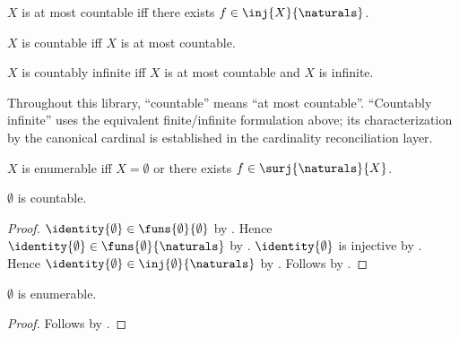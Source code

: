 \begin{definition}\label{at_most_countable}
    $X$ is at most countable iff there exists $f\in\inj{X}{\naturals}$.
\end{definition}

\begin{abbreviation}\label{countable}
    $X$ is countable iff $X$ is at most countable.
\end{abbreviation}

\begin{definition}\label{countably_infinite}
    $X$ is countably infinite iff $X$ is at most countable and $X$ is infinite.
\end{definition}

Throughout this library, ``countable'' means ``at most countable''.
``Countably infinite'' uses the equivalent finite/infinite formulation above;
its characterization by the canonical cardinal is established in the
cardinality reconciliation layer.

\begin{definition}\label{enumerable}
    $X$ is enumerable iff $X=\emptyset$ or
        there exists $f\in\surj{\naturals}{X}$.
\end{definition}

\begin{proposition}\label{emptyset_countable}
    $\emptyset$ is countable.
\end{proposition}
\begin{proof}
    $\identity{\emptyset}\in\funs{\emptyset}{\emptyset}$
        by .
    Hence $\identity{\emptyset}\in\funs{\emptyset}{\naturals}$
        by .
    $\identity{\emptyset}$ is injective by .
    Hence $\identity{\emptyset}\in\inj{\emptyset}{\naturals}$
        by .
    Follows by .
\end{proof}

\begin{proposition}\label{emptyset_enumerable}
    $\emptyset$ is enumerable.
\end{proposition}
\begin{proof}
    Follows by .
\end{proof}

